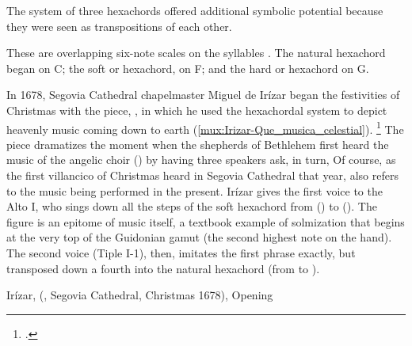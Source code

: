 The system of three hexachords offered additional symbolic potential because
they were seen as transpositions of each other.%
\begin{Footnote}
    These are overlapping six-note scales on the syllables .
    The natural hexachord began on C; the soft or  hexachord, on
    F; and the hard or  hexachord on G.
    \Autocites{Judd:RenaissanceModalTheory}
    {Barnett:TonalOrganization17C}
    {Berger:Ficta}
\end{Footnote}
In 1678, Segovia Cathedral chapelmaster Miguel de Irízar began the festivities
of Christmas with the  piece, , in
which he used the hexachordal system to depict heavenly music coming down to
earth (\cref{mux:Irizar-Que_musica_celestial}).%
    \footnote{.}
The piece dramatizes the moment when the shepherds of Bethlehem first heard the
music of the angelic choir () by having three speakers ask,
in turn,
Of course, as the first villancico of Christmas heard in Segovia Cathedral that
year,  also refers to the music being performed in
the present.
Irízar gives the first voice to the Alto I, who sings down all the steps of the
soft hexachord from  () to  ().
The figure is an epitome of music itself, a textbook example of solmization
that begins at the very top of the Guidonian gamut (the second highest note on
the hand).
The second voice (Tiple I-1), then, imitates the first phrase exactly, but
transposed down a fourth into the natural hexachord (from  to
).

{Irízar,  (, Segovia Cathedral,
Christmas 1678), Opening}


